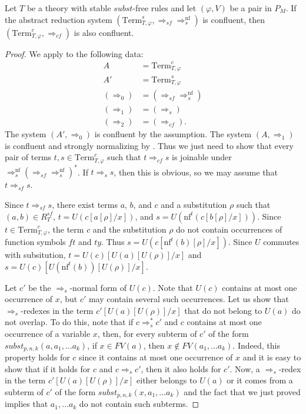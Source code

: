 \documentclass[reqno]{amsart}
\theoremstyle{definition}
\theoremstyle{remark}
\newcommand{\nf}{\mathrm{nf}}
\newcommand{\Term}{\mathrm{Term}}
\newcommand{\subst}{\mathit{subst}}
\newcommand{\ft}{\mathit{ft}}
\newcommand{\ty}{\mathit{ty}}
\numberwithin{figure}{section}
\begin{document}
\begin{prop}
Let $T$ be a theory with stable $\subst$-free rules and let $(\varphi,V)$ be a pair in $P_M$.
If the abstract reduction system $(\Term_{T,\varphi}^s, \Rightarrow_{sf} \Rightarrow_s^\nf)$ is confluent, then $(\Term_{T,\varphi}^c,\Rightarrow_{cf})$ is also confluent.
\end{prop}
\begin{proof}
We apply  to the following data:
\begin{align*}
A & = \Term_{T,\varphi}^c \\
A' & = \Term_{T,\varphi}^s \\
(\Rightarrow_0) & = (\Rightarrow_{sf} \Rightarrow_s^\nf) \\
(\Rightarrow_1) & = (\Rightarrow_s) \\
(\Rightarrow_2) & = (\Rightarrow_{cf}).
\end{align*}
The system $(A',\Rightarrow_0)$ is confluent by the assumption.
The system $(A,\Rightarrow_1)$ is confluent and strongly normalizing by .
Thus we just need to show that every pair of terms $t,s \in \Term_{T,\varphi}^c$ such that $t \Rightarrow_{cf} s$ is joinable under $\Rightarrow_s^\nf (\Rightarrow_{sf} \Rightarrow_s^\nf)^*$.
If $t \Rightarrow_s s$, then this is obvious, so we may assume that $t \Rightarrow_{sf} s$.

Since $t \Rightarrow_{sf} s$, there exist terms $a$, $b$, and $c$ and a substitution $\rho$ such that $(a,b) \in R_T^{sf}$, $t = U(c[a[\rho]/x])$, and $s = U(\nf^t(c[b[\rho]/x]))$.
Since $t \in \Term_{T,\varphi}^c$, the term $c$ and the substitution $\rho$ do not contain occurrences of function symbols $\ft$ and $\ty$.
Thus $s = U(c[\nf^t(b)[\rho]/x])$.
Since $U$ commutes with subsitution, $t = U(c)[U(a)[U(\rho)]/x]$ and $s = U(c)[U(\nf^t(b))[U(\rho)]/x]$.

Let $c'$ be the $\Rightarrow_s$-normal form of $U(c)$.
Note that $U(c)$ contains at most one occurrence of $x$, but $c'$ may contain several such occurrences.
Let us show that $\Rightarrow_s$-redexes in the term $c'[U(a)[U(\rho)]/x]$ that do not belong to $U(a)$ do not overlap.
To do this, note that if $c \Rightarrow_s^* c'$ and $c$ contains at most one occurrence of a variable $x$, then, for every subterm of $c'$ of the form $\subst_{p,n,k}(a, a_1, \ldots a_k)$, if $x \in FV(a)$, then $x \notin FV(a_1, \ldots a_k)$.
Indeed, this property holds for $c$ since it contains at most one occurrence of $x$ and it is easy to show that if it holds for $c$ and $c \Rightarrow_s c'$, then it also holds for $c'$.
Now, a $\Rightarrow_s$-redex in the term $c'[U(a)[U(\rho)]/x]$ either belongs to $U(a)$ or it comes from a subterm of $c'$ of the form $\subst_{p,n,k}(x, a_1, \ldots a_k)$ and the fact that we just proved implies that $a_1, \ldots a_k$ do not contain such subterms.


\end{proof}
\end{document}
